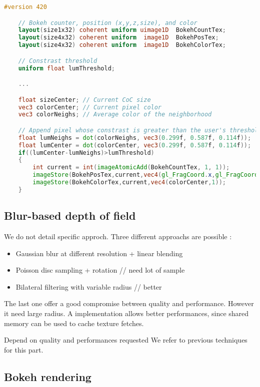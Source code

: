 \begin{lstlisting}[language=GLSL,float={htb},caption={Fragment shader for extracting bokehs.},label={YourName:listing1}]
	#version 420

	// Bokeh counter, position (x,y,z,size), and color
	layout(size1x32) coherent uniform uimage1D 	BokehCountTex;
	layout(size4x32) coherent uniform  image1D 	BokehPosTex;
	layout(size4x32) coherent uniform  image1D 	BokehColorTex;

	// Constrast threshold
	uniform float lumThreshold;

	...

	float sizeCenter; // Current CoC size
	vec3 colorCenter; // Current pixel color
	vec3 colorNeighs; // Average color of the neighborhood

	// Append pixel whose constrast is greater than the user's threshold
	float lumNeighs = dot(colorNeighs, vec3(0.299f, 0.587f, 0.114f));
	float lumCenter = dot(colorCenter, vec3(0.299f, 0.587f, 0.114f));
	if((lumCenter-lumNeighs)>lumThreshold)
	{
		int current = int(imageAtomicAdd(BokehCountTex, 1, 1));
		imageStore(BokehPosTex,current,vec4(gl_FragCoord.x,gl_FragCoord.y,gl_FragCoord.z,sizeCenter));
		imageStore(BokehColorTex,current,vec4(colorCenter,1));
	}
\end{lstlisting}


\subsection{Blur-based depth of field}
We do not detail specific approch. Three different approachs are possible : 
\begin{itemize}
	\item Gaussian blur at different resolution + linear blending
	\item Poisson disc sampling + rotation // need lot of sample
	\item Bilateral filtering with variable radius // better
\end{itemize}

The last one offer a good compromise between quality and performance. However it need large radius. A \opencl implementation allows better performances, since shared memory can be used to cache texture fetches.

Depend on quality and performances requested
We refer to previous techniques for this part.

\subsection{Bokeh rendering}

